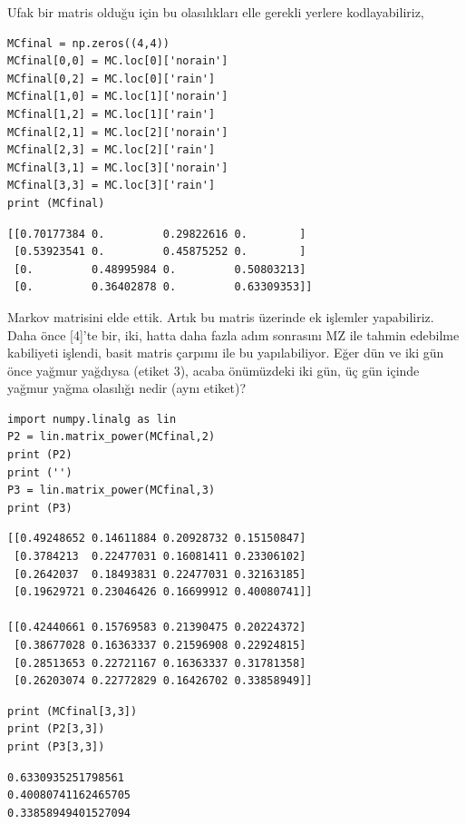 \documentclass[12pt,fleqn]{article}\usepackage{../../common}
\begin{document}
Ufak bir matris olduğu için bu olasılıkları elle gerekli yerlere kodlayabiliriz,

\begin{verbatim}
MCfinal = np.zeros((4,4))
MCfinal[0,0] = MC.loc[0]['norain']
MCfinal[0,2] = MC.loc[0]['rain']
MCfinal[1,0] = MC.loc[1]['norain']
MCfinal[1,2] = MC.loc[1]['rain']
MCfinal[2,1] = MC.loc[2]['norain']
MCfinal[2,3] = MC.loc[2]['rain']
MCfinal[3,1] = MC.loc[3]['norain']
MCfinal[3,3] = MC.loc[3]['rain']
print (MCfinal)
\end{verbatim}

\begin{verbatim}
[[0.70177384 0.         0.29822616 0.        ]
 [0.53923541 0.         0.45875252 0.        ]
 [0.         0.48995984 0.         0.50803213]
 [0.         0.36402878 0.         0.63309353]]
\end{verbatim}

Markov matrisini elde ettik. Artık bu matris üzerinde ek işlemler
yapabiliriz. Daha önce [4]'te bir, iki, hatta daha fazla adım sonrasını MZ ile
tahmin edebilme kabiliyeti işlendi, basit matris çarpımı ile bu
yapılabiliyor. Eğer dün ve iki gün önce yağmur yağdıysa (etiket 3), acaba
önümüzdeki iki gün, üç gün içinde yağmur yağma olasılığı nedir (aynı etiket)?

\begin{verbatim}
import numpy.linalg as lin
P2 = lin.matrix_power(MCfinal,2)
print (P2)
print ('')
P3 = lin.matrix_power(MCfinal,3)
print (P3)
\end{verbatim}

\begin{verbatim}
[[0.49248652 0.14611884 0.20928732 0.15150847]
 [0.3784213  0.22477031 0.16081411 0.23306102]
 [0.2642037  0.18493831 0.22477031 0.32163185]
 [0.19629721 0.23046426 0.16699912 0.40080741]]

[[0.42440661 0.15769583 0.21390475 0.20224372]
 [0.38677028 0.16363337 0.21596908 0.22924815]
 [0.28513653 0.22721167 0.16363337 0.31781358]
 [0.26203074 0.22772829 0.16426702 0.33858949]]
\end{verbatim}

\begin{verbatim}
print (MCfinal[3,3])
print (P2[3,3])
print (P3[3,3])
\end{verbatim}

\begin{verbatim}
0.6330935251798561
0.40080741162465705
0.33858949401527094
\end{verbatim}
\end{document}
